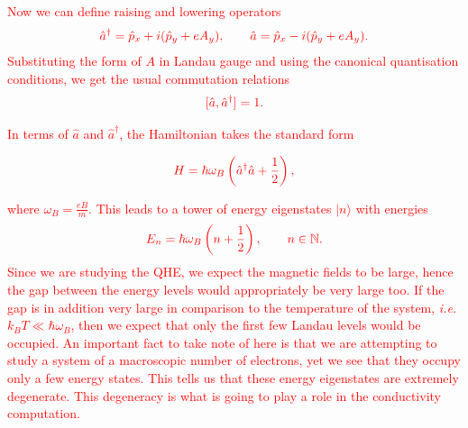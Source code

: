  \textcolor{red}{Now we can define raising and lowering operators }
\begin{align}
    \textcolor{red}{\hat{a}^{\dagger}= \hat{p}_x +i (\hat{p}_y +e A_y), \qquad \hat{a}= \hat{p}_x  -i (\hat{p}_y +e A_y).}
\end{align}
 \textcolor{red}{Substituting the form of $A$ in Landau gauge and using the canonical quanti\textcolor{red}{s}ation conditions, we get the usual commutation relations}
\begin{align}
    \textcolor{red}{ [\hat{a}, \hat{a}^{\dagger}] =1.}
\end{align}

 \textcolor{red}{ In terms of $\hat{a}$ and $\hat{a}^{\dagger}$, the Hamiltonian takes the standard form}

\begin{align}
    \textcolor{red}{ H = \hbar \omega_B \left( \hat{a}^{\dagger} \hat{a}+ \frac{1}{2}\right),}
\end{align}

 \textcolor{red}{ where $\omega_B=\frac{eB}{m}$. This leads to a tower of energy eigenstates $|n\rangle$ with energies}
\begin{align}
    \textcolor{red}{ E_n= \hbar \omega_B \left( n + \frac{1}{2} \right), \qquad n \in \mathbb{N}.}
\end{align}
 \textcolor{red}{ Since we are studying the QHE, we expect the magnetic fields to be large, hence the gap between the energy levels would appropriately be very large too. If the gap is in addition very large in comparison to the temperature of the system, \textit{i.e.} $k_B T \ll \hbar \omega_B$, then we expect that only the first few Landau levels would be occupied. An important fact to take note of here is that we are attempting to study a system of a macroscopic number of electrons, yet we see that they occupy only a few energy states. This tells us that these energy eigenstates are extremely degenerate. This degeneracy is what is going to play a role in the conductivity computation.}

